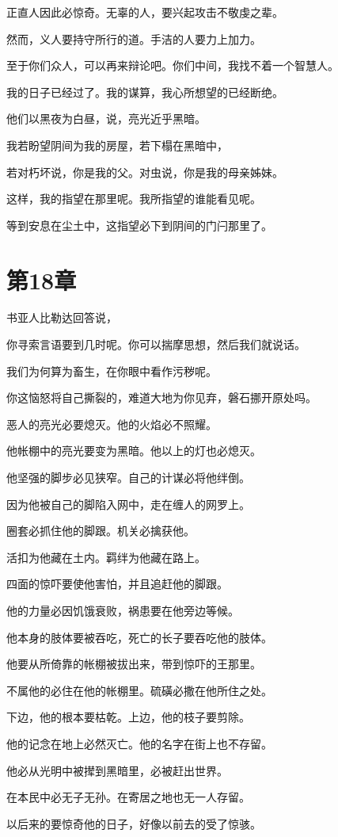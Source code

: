 \documentclass[12pt,oneside]{book}
\begin{document}
正直人因此必惊奇。无辜的人，要兴起攻击不敬虔之辈。

然而，义人要持守所行的道。手洁的人要力上加力。

至于你们众人，可以再来辩论吧。你们中间，我找不着一个智慧人。

我的日子已经过了。我的谋算，我心所想望的已经断绝。

他们以黑夜为白昼，说，亮光近乎黑暗。

我若盼望阴间为我的房屋，若下榻在黑暗中，

若对朽坏说，你是我的父。对虫说，你是我的母亲姊妹。

这样，我的指望在那里呢。我所指望的谁能看见呢。

等到安息在尘土中，这指望必下到阴间的门闩那里了。


\chapter{第18章}
书亚人比勒达回答说，

你寻索言语要到几时呢。你可以揣摩思想，然后我们就说话。

我们为何算为畜生，在你眼中看作污秽呢。

你这恼怒将自己撕裂的，难道大地为你见弃，磐石挪开原处吗。

恶人的亮光必要熄灭。他的火焰必不照耀。

他帐棚中的亮光要变为黑暗。他以上的灯也必熄灭。

他坚强的脚步必见狭窄。自己的计谋必将他绊倒。

因为他被自己的脚陷入网中，走在缠人的网罗上。

圈套必抓住他的脚跟。机关必擒获他。

活扣为他藏在土内。羁绊为他藏在路上。

四面的惊吓要使他害怕，并且追赶他的脚跟。

他的力量必因饥饿衰败，祸患要在他旁边等候。

他本身的肢体要被吞吃，死亡的长子要吞吃他的肢体。

他要从所倚靠的帐棚被拔出来，带到惊吓的王那里。

不属他的必住在他的帐棚里。硫磺必撒在他所住之处。

下边，他的根本要枯乾。上边，他的枝子要剪除。

他的记念在地上必然灭亡。他的名字在街上也不存留。

他必从光明中被撵到黑暗里，必被赶出世界。

在本民中必无子无孙。在寄居之地也无一人存留。

以后来的要惊奇他的日子，好像以前去的受了惊骇。
\end{document}

